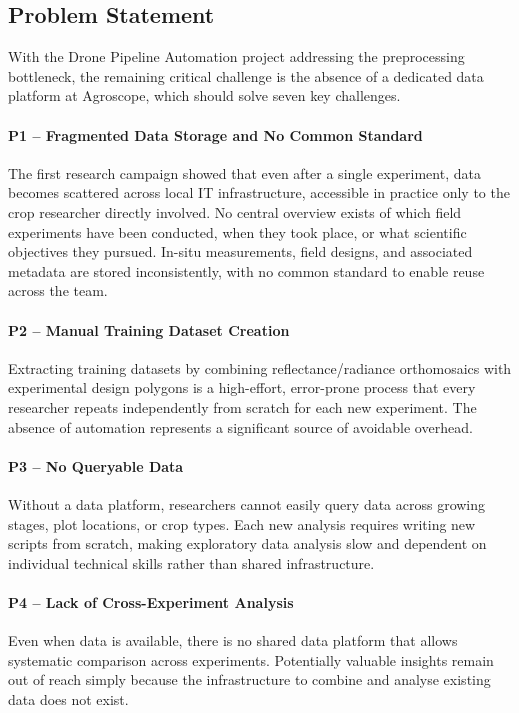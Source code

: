\subsection{Problem Statement}
With the Drone Pipeline Automation project addressing the preprocessing bottleneck, the remaining critical challenge is the absence of a dedicated data platform at Agroscope, which should solve seven key challenges.

\paragraph{P1 -- Fragmented Data Storage and No Common Standard} The first research campaign \parencite{schneider_retrieval_2026} showed that even after a single experiment, data becomes scattered across local IT infrastructure, accessible in practice only to the crop researcher directly involved. No central overview exists of which field experiments have been conducted, when they took place, or what scientific objectives they pursued. In-situ measurements, field designs, and associated metadata are stored inconsistently, with no common standard to enable reuse across the team.

\paragraph{P2 -- Manual Training Dataset Creation} Extracting training datasets by combining reflectance/radiance orthomosaics with experimental design polygons is a high-effort, error-prone process that every researcher repeats independently from scratch for each new experiment. The absence of automation represents a significant source of avoidable overhead.

\paragraph{P3 -- No Queryable Data} Without a data platform, researchers cannot easily query data across growing stages, plot locations, or crop types. Each new analysis requires writing new scripts from scratch, making exploratory data analysis slow and dependent on individual technical skills rather than shared infrastructure.

\paragraph{P4 -- Lack of Cross-Experiment Analysis} Even when data is available, there is no shared data platform that allows systematic comparison across experiments. Potentially valuable insights remain out of reach simply because the infrastructure to combine and analyse existing data does not exist.

